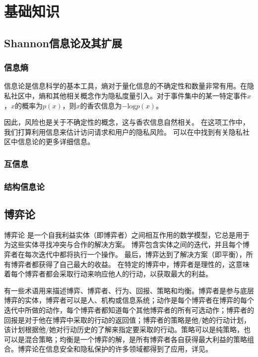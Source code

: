 \chapter{基础知识}
\label{chap:preliminary}


\section{Shannon信息论及其扩展}
\subsection{信息熵}



信息论\cite{shannon1948mathematical,csiszar2004,stone2018}是信息科学的基本工具，熵对于量化信息的不确定性和数量非常有用。在隐私社区中，熵和其他相关概念作为隐私度量引入\cite{wagner2018}。对于事件集中的某一特定事件$x$，$x$的概率为$p(x)$，则$x$的香农信息为$-\text{log}p(x)$。

因此，风险也是关于不确定性的概念，这与香农信息自然相关。 在这项工作中，我们打算利用信息来估计访问请求和用户的隐私风险。 可以在\cite{wagner2018}中找到有关隐私社区中信息论的更多详细信息。



\subsection{互信息}
\subsection{结构信息论}

\section{博弈论}
博弈论\cite{owen2001,gibbons1992} 是一个自我利益实体（即博弈者）之间相互作用的数学模型，它总是用于为这些实体寻找冲突与合作的解决方案。 博弈包含实体之间的迭代，并且每个博弈者在每次迭代中都将执行一个操作。 最后，博弈达到了解决方案（即平衡），所有博弈者都获得了自己最大的收益。 在特定的博弈中，博弈者是理性的，这意味着每个博弈者都会采取行动来响应他人的行动，以获取最大的利益。

有一些术语用来描述博弈、博弈者、行为、回报、策略和均衡\cite{liang2013}。博弈者是参与底层博弈的实体，博弈者可以是人、机构或信息系统；动作是每个博弈者在博弈的每个迭代中所做的动作，每个博弈者都知道每个其他博弈者的所有可选动作；博弈者的回报是对于他在博弈中采取的行动的返回值；博弈者的策略是他/她的行动计划，该计划根据他/她对行动历史的了解来指定要采取的行动。策略可以是纯策略，也可以是混合策略；均衡是一个博弈的解，是所有博弈者各自获得最大利益的策略组合。博弈论在信息安全和隐私保护的许多领域都得到了应用，详见\cite{liang2013,tian2019}。
